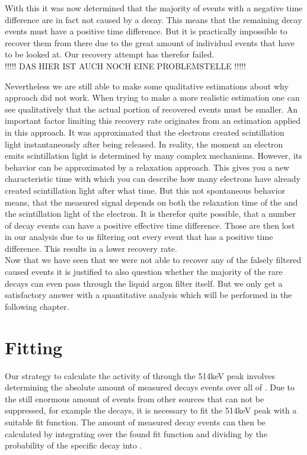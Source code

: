 With this it was now determined that the majority of events with a negative time difference are in fact not caused by a \Kr decay.
This means that the remaining \Kr decay events must have a positive time difference.
But it is practically impossible to recover them from there due to the great amount of individual events that have to be looked at.
Our recovery attempt has therefor failed.
\\

!!!!! DAS HIER IST AUCH NOCH EINE PROBLEMSTELLE !!!!!

Nevertheless we are still able to make some qualitative estimations about why approach did not work. 
When trying to make a more realistic estimation one can see qualitatively that the actual portion of recovered events must be smaller.
An important factor limiting this recovery rate originates from an estimation applied in this approach.
It was approximated that the electrons created scintillation light instantaneously after being released.
In reality, the moment an electron emits scintillation light is determined by many complex mechanisms. 
However, its behavior can be approximated by a relaxation approach. 
This gives you a new characteristic time with which you can describe how many electrons have already created scintillation light after what time. 
But this not spontaneous behavior means, that the measured signal depends on both the relaxation time of the  and the scintillation light of the electron.
It is therefor quite possible, that a number of \Kr decay events can have a positive effective time difference.
Those are then lost in our analysis due to us filtering out every event that has a positive time difference.
This results in a lower recovery rate.
\\

Now that we have seen that we were not able to recover any of the falsely filtered \Kr caused events it is justified to also question whether the majority of the rare \Kr decays can even pass through the liquid argon filter itself.
But we only get a satisfactory answer with a quantitative analysis which will be performed in the following chapter.
\\

\section{Fitting}
\label{sec:Fitting}

Our strategy to calculate the activity of \Kr through the 514keV peak involves determining the absolute amount of measured \Kr decays events over all of \PII.
Due to the still enormous amount of events from other sources that can not be suppressed, for example the  decays, it is necessary to fit the 514keV peak with a suitable fit function.
The amount of measured \Kr decay events can then be calculated by integrating over the found fit function and dividing by the probability of the specific decay into .
\\

